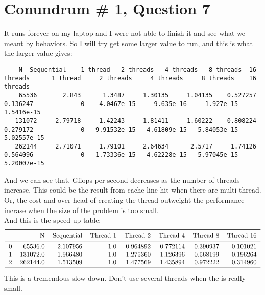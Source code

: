 \documentclass[]{article}
\begin{document}
\section*{Conundrum \# 1, Question 7}
    It runs forever on my laptop and I were not able to finish it and see what we meant by behaviors. So I will try get some larger value to run, and this is what the larger value gives: 
    \begin{lstlisting}
    N  Sequential    1 thread   2 threads   4 threads   8 threads  16 threads      1 thread     2 threads     4 threads     8 threads    16 threads
    65536       2.843      1.3487     1.30135     1.04135    0.527257    0.136247             0    4.0467e-15     9.635e-16     1.927e-15    1.5416e-15
   131072     2.79718     1.42243     1.81411     1.60222    0.808224    0.279172             0   9.91532e-15   4.61809e-15   5.84053e-15   5.02557e-15
   262144     2.71071     1.79101     2.64634      2.5717     1.74126    0.564096             0   1.73336e-15   4.62228e-15   5.97045e-15   5.20007e-15 
    \end{lstlisting}
    And we can see that, Gflops per second decreases as the number of threads increase. This could be the result from cache line hit when there are multi-thread. Or, the cost and over head of creating the thread outweight the performance incrase when the size of the problem is too small. 
    \\
    And this is the speed up table: 
    $$
        \begin{tabular}{lrrrrrrr}
            \toprule
            {} &N &Sequential &Thread 1 &Thread 2 &Thread 4 &Thread 8 &Thread 16 \\
            \midrule
            0 &   65536.0 &  2.107956 &  1.0 &  0.964892 &  0.772114 &  0.390937 &  0.101021 \\
            1 &  131072.0 &  1.966480 &  1.0 &  1.275360 &  1.126396 &  0.568199 &  0.196264 \\
            2 &  262144.0 &  1.513509 &  1.0 &  1.477569 &  1.435894 &  0.972222 &  0.314960 \\
            \bottomrule
        \end{tabular}    
    $$
    This is a tremendous slow down. Don't use several threads when the is really small. 
\end{document}
